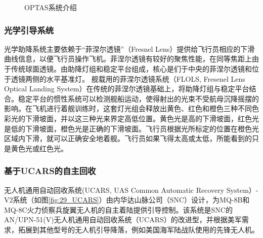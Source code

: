 \begin{figure}[htb]
	\centering%
	\hspace{4em}%
	\caption{OPTAS系统介绍}
	\label{fig:15_OPTAS}
\end{figure}


\subsubsection{光学引导系统}
光学助降系统主要依赖于“菲涅尔透镜”（Fresnel Lens）提供给飞行员相应的下滑曲线信息，以便飞行员操作飞机。菲涅尔透镜有较好的聚焦性能，在同等焦距上由于传统球面透镜。由助降灯组和稳定平台组成，核心是们于中央的菲涅尔透镜和位于透镜两侧的水平基准灯。	舰载用的菲涅尔透镜系统（FLOLS, Fresenel Lens Optical Landing System）在传统的菲涅尔透镜基础上，将助降灯组与稳定平台结合。稳定平台的惯性系统可以检测舰船运动，使得射出的光束不受航母沉降摇摆的影响。在飞机进行着舰训练时，这套灯光组会释放出黄色、红色和橙色三种不同色彩光的下滑坡面，并以这三种光来界定高低位置。黄色光是高的下滑坡面，红色光是低的下滑坡面，橙色光是正确的下滑坡面。飞行员根据光所标定的位置在橙色光区域内下滑，就可以正确安全地着舰。飞行员如果飞得太高或太低，所能看到的只是黄色光或红色光。


\subsubsection{基于UCARS的自主回收}
无人机通用自动回收系统(UCARS, UAS Common Automatic Recovery System）-V2系统（如图\ref{fig:29_UCARS}）由内华达山脉公司（SNC）设计，为MQ-8B和MQ-8C火力侦察兵旋翼无人机的自主着陆提供引导控制。该系统是SNC的AN/UPN-51(V)无人机通用自动回收系统（UCARS）的改进型，并根据美军需求，拓展到其他型号的无人机引导降落，例如美国海军陆战队使用的先锋无人机。

